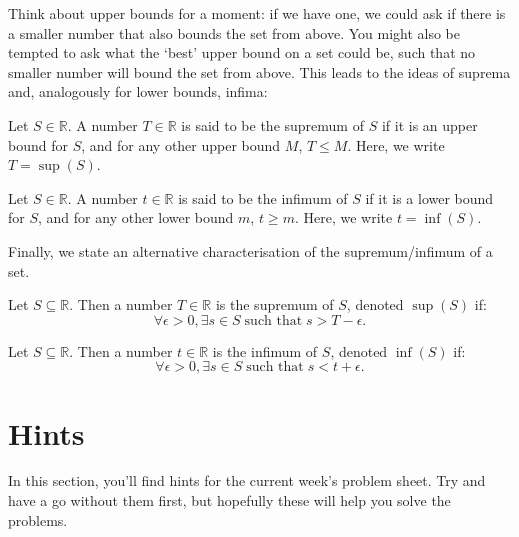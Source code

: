 \documentclass[
  10pt,
  a4paper]{article}
\theoremstyle{plain}
\theoremstyle{definition}
\theoremstyle{plain}
\theoremstyle{plain}
\theoremstyle{plain}
\theoremstyle{plain}
\theoremstyle{definition}
\theoremstyle{definition}
\theoremstyle{remark}
\theoremstyle{remark}
\let\BeginKnitrBlock\begin \let\EndKnitrBlock\end
\begin{document}
Think about upper bounds for a moment: if we have one, we could ask if there is a smaller number that also bounds the set from above. You might also be tempted to ask what the `best' upper bound on a set could be, such that no smaller number will bound the set from above. This leads to the ideas of suprema and, analogously for lower bounds, infima:

\BeginKnitrBlock{definition}[Supremum]
{\label{def:def9} }Let \(S \in \mathbb{R}\). A number \(T \in \mathbb{R}\) is said to be the supremum of \(S\) if it is an upper bound for \(S\), and for any other upper bound \(M\), \(T \leq M\). Here, we write \(T = \sup(S)\).
\EndKnitrBlock{definition}

\BeginKnitrBlock{definition}[Infimum]
{\label{def:def10} }Let \(S \in \mathbb{R}\). A number \(t \in \mathbb{R}\) is said to be the infimum of \(S\) if it is a lower bound for \(S\), and for any other lower bound \(m\), \(t\geq m\). Here, we write \(t = \inf(S)\).
\EndKnitrBlock{definition}

Finally, we state an alternative characterisation of the supremum/infimum of a set.
\BeginKnitrBlock{proposition}
{\label{prp:prop2} }Let \(S\subseteq\mathbb{R}\). Then a number \(T\in\mathbb{R}\) is the supremum of \(S\), denoted \(\sup(S)\) if: \[\forall \epsilon > 0, \exists s \in S\; \text{such that} \; s > T - \epsilon.\]
\EndKnitrBlock{proposition}

\BeginKnitrBlock{proposition}
{\label{prp:prop3} }Let \(S\subseteq\mathbb{R}\). Then a number \(t\in\mathbb{R}\) is the infimum of \(S\), denoted \(\inf(S)\) if: \[\forall \epsilon > 0, \exists s \in S\; \text{such that} \; s < t + \epsilon.\]
\EndKnitrBlock{proposition}

\hypertarget{hints}{%
\section{Hints}\label{hints}}

In this section, you'll find hints for the current week's problem sheet. Try and have a go without them first, but hopefully these will help you solve the problems.
\end{document}
